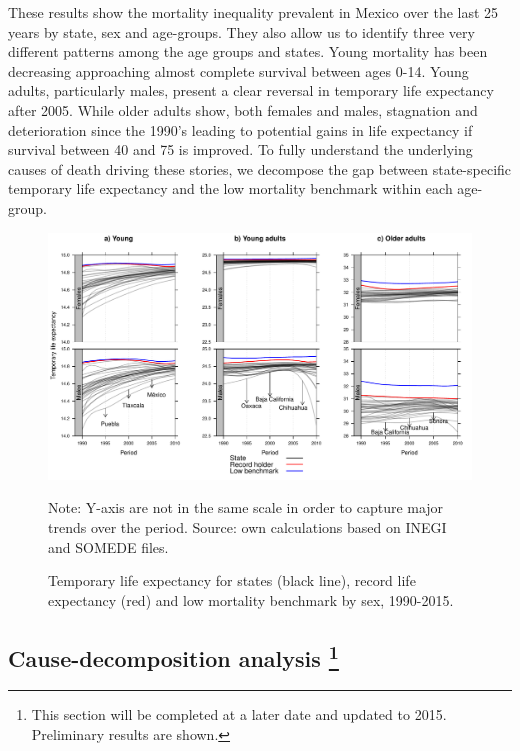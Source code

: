 \documentclass[11.5pt]{article}
\begin{document}
\begin{spacing}{1.5}
These results show the mortality inequality prevalent in Mexico over the last 25 years by state, sex and age-groups. They also allow us to identify three very different patterns among the age groups and states. Young mortality has been decreasing approaching almost complete survival between ages 0-14. Young adults, particularly males, present a clear reversal in temporary life expectancy after 2005. While older adults show, both females and males, stagnation and deterioration since the 1990's leading to potential gains in life expectancy if survival between 40 and 75 is improved. To fully understand the underlying causes of death driving these stories, we decompose the gap between state-specific temporary life expectancy and the low mortality benchmark within each age-group.


\begin{figure}
\label{Fig_temporary_le}
\centering
\caption{Temporary life expectancy for states (black line), record life
expectancy (red) and low mortality benchmark by sex, 1990-2015.}
\includegraphics[scale=.5]{Figures/Temp_fig.pdf}

Note: Y-axis are not in the same scale in order to capture major trends over the period. Source: own calculations based on INEGI and SOMEDE files. 
\end{figure}



\subsection*{Cause-decomposition analysis \footnote{This section will be completed at a later date and updated to 2015. Preliminary results are shown.
}}


\end{spacing}
\end{document}
